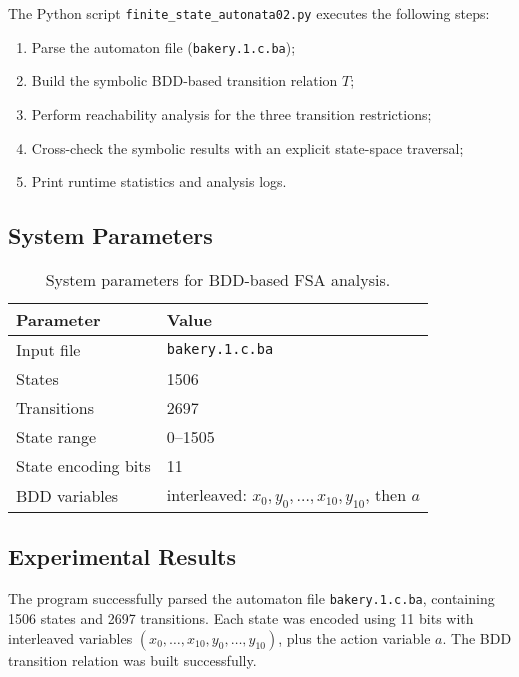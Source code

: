 \documentclass[a4paper,11pt]{article}
\begin{document}
The Python script \texttt{finite\_state\_autonata02.py} executes the following steps:

\begin{enumerate}
  \item Parse the automaton file (\texttt{bakery.1.c.ba});
  \item Build the symbolic BDD-based transition relation \(T\);
  \item Perform reachability analysis for the three transition restrictions;
  \item Cross-check the symbolic results with an explicit state-space traversal;
  \item Print runtime statistics and analysis logs.
\end{enumerate}



\subsection*{System Parameters}

\begin{table}[h]
\centering
\begin{tabular}{l|l}
\textbf{Parameter} & \textbf{Value} \\\hline
Input file & \texttt{bakery.1.c.ba} \\
States & 1506 \\
Transitions & 2697 \\
State range & 0--1505 \\
State encoding bits & 11 \\
BDD variables & interleaved: $x_0,y_0,\dots,x_{10},y_{10}$, then $a$ \\

\end{tabular}
\caption{System parameters for BDD-based FSA analysis.}
\end{table}



\subsection*{Experimental Results}

The program successfully parsed the automaton file \texttt{bakery.1.c.ba},
containing 1506 states and 2697 transitions.
Each state was encoded using 11 bits with interleaved variables
$(x_0,\dots,x_{10},y_0,\dots,y_{10})$, plus the action variable $a$.
The BDD transition relation was built successfully.
\end{document}
